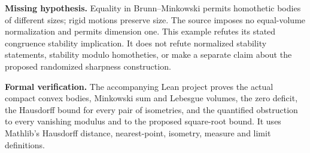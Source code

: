 \documentclass[11pt]{article}
\begin{document}
\noindent\textbf{Missing hypothesis.} Equality in Brunn--Minkowski permits homothetic bodies of different sizes; rigid motions preserve size. The source imposes no equal-volume normalization and permits dimension one. This example refutes its stated congruence stability implication. It does not refute normalized stability statements, stability modulo homotheties, or make a separate claim about the proposed randomized sharpness construction.

\noindent\textbf{Formal verification.} The accompanying Lean project proves the actual compact convex bodies, Minkowski sum and Lebesgue volumes, the zero deficit, the Hausdorff bound for every pair of isometries, and the quantified obstruction to every vanishing modulus and to the proposed square-root bound. It uses Mathlib's Hausdorff distance, nearest-point, isometry, measure and limit definitions.
\end{document}
